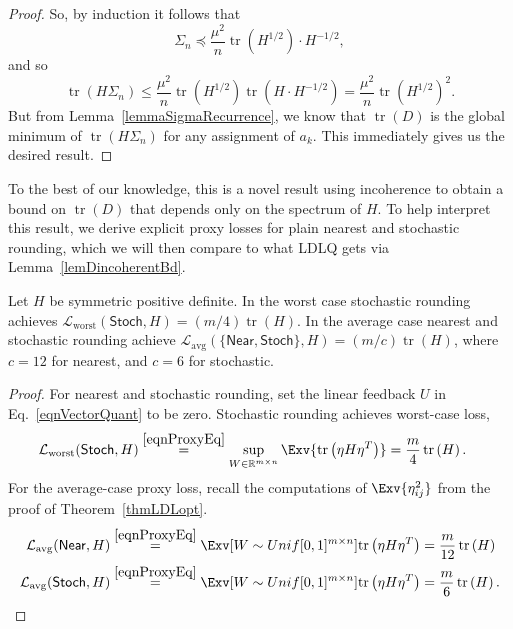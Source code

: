 \begin{proof}
So, by induction it follows that
\[
    \Sigma_n \preceq \frac{\mu^2}{n} \operatorname{tr}\left(H^{1/2}\right) \cdot H^{-1/2},
\]
and so
\[
    \operatorname{tr}\left(H \Sigma_n\right) \le \frac{\mu^2}{n} \operatorname{tr}\left(H^{1/2}\right) \operatorname{tr}\left(H \cdot H^{-1/2}\right)
    = \frac{\mu^2}{n} \operatorname{tr}\left(H^{1/2}\right)^2.
\]
But from Lemma~\ref{lemmaSigmaRecurrence}, we know that $\operatorname{tr}\left(D\right)$ is the global minimum of $\operatorname{tr}\left(H \Sigma_n\right)$ for any assignment of $a_k$. This immediately gives us the desired result.
\end{proof}

To the best of our knowledge, this is a novel result  using incoherence to obtain a bound on $\operatorname{tr}\left(D\right)$ that depends only on the spectrum of $H$. To help interpret this result, we derive explicit proxy losses for plain nearest and stochastic rounding, which we will then compare to what LDLQ gets via Lemma~\ref{lemDincoherentBd}.

\begin{lemmarep}\label{lemNearStochProxyH}
Let $H$ be symmetric positive definite. In the worst case stochastic rounding achieves $\mathcal{L}_{\operatorname{worst}}(\mathsf{Stoch}, H) = (m/4) \operatorname{tr}\left(H\right)$.
In the average case nearest and stochastic rounding achieve $\mathcal{L}_{\operatorname{avg}}(\{\mathsf{Near}, \mathsf{Stoch}\}, H) = (m/c) \operatorname{tr}\left(H\right)$, where $c=12$ for nearest, and $c=6$ for stochastic.
\end{lemmarep}

\begin{proof}
For nearest and stochastic rounding, set the linear feedback $U$ in Eq.~\eqref{eqnVectorQuant} to be zero. Stochastic rounding achieves worst-case loss,
\begin{align}
    \mathcal{L}_{\operatorname{worst}}(\mathsf{Stoch}, H)
    &\stackrel{\eqref{eqnProxyEq}}{=}
    \sup_{W \in \mathbb{R}^{m \times n}} \Exv{ \operatorname{tr}\left( \eta H \eta^T \right) } = \frac m4 \operatorname{tr}\left( H \right).
    \label{eqnThm3proofb}
\end{align}
For the average-case proxy loss, recall the computations of $\Exv{ \eta_{ij}^2 }$ from the proof of Theorem~\ref{thmLDLopt}.
\begin{align}
    \mathcal{L}_{\operatorname{avg}}(\mathsf{Near}, H)
    &\stackrel{\eqref{eqnProxyEq}}{=}
    \Exv[{W \sim Unif[0,1]^{m \times n}}]{ \operatorname{tr}\left( \eta H \eta^T \right) } = \frac{m}{12} \operatorname{tr}\left( H \right) 
    \label{eqnThm3proofc}\\
    \mathcal{L}_{\operatorname{avg}}(\mathsf{Stoch}, H)
    &\stackrel{\eqref{eqnProxyEq}}{=}
    \Exv[{W \sim Unif[0,1]^{m \times n}}]{ \operatorname{tr}\left( \eta H \eta^T \right) } = \frac m6 \operatorname{tr}\left( H \right).
    \label{eqnThm3proofd}
\end{align}
\end{proof}

